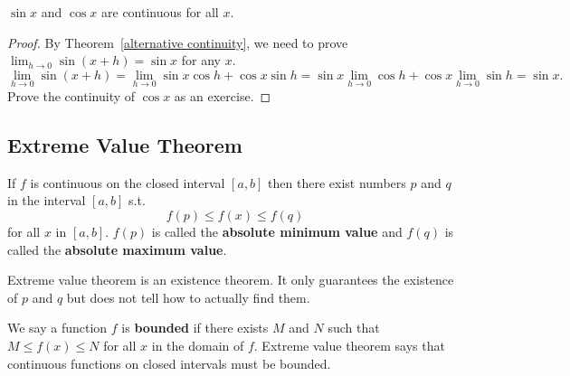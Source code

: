 \documentclass[calc1-main.tex]{subfiles}
\begin{document}
\begin{theorem}
	$\sin x$ and $\cos x$ are continuous for all $x$.
\end{theorem}
\begin{proof}
	By Theorem~\ref{alternative continuity}, we need to prove $\lim_{h \to 0} \sin (x+h) = \sin x$ for any $x$.
	\[
		\lim_{h \to 0} \sin(x+h) =
		\lim_{h \to 0} \sin x \cos h + \cos x \sin h =
		\sin x \lim_{h \to 0} \cos h + \cos x \lim_{h \to 0} \sin h = \sin x.
	\]
	Prove the continuity of $\cos x$ as an exercise.
\end{proof}
\subsection*{Extreme Value Theorem}

\begin{theorem}
	If $f$ is continuous on the closed interval $[a, b]$ then there exist numbers $p$ and $q$ in the interval $[a,b]$ s.t.
	\[
		f(p) \leq f(x) \leq f(q)
	\]
	for all $x$ in $[a, b]$.
	$f(p)$ is called the \textbf{absolute minimum value} and $f(q)$ is called the \textbf{absolute maximum value}.
\end{theorem}

Extreme value theorem is an existence theorem. It only guarantees the existence of $p$ and $q$ but does not tell how to actually find them.

We say a function $f$ is \textbf{bounded} if there exists $M$ and $N$ such that $M \le f(x) \le N$ for all $x$ in the domain of $f$. Extreme value theorem says that continuous functions on closed intervals must be bounded.
\end{document}
